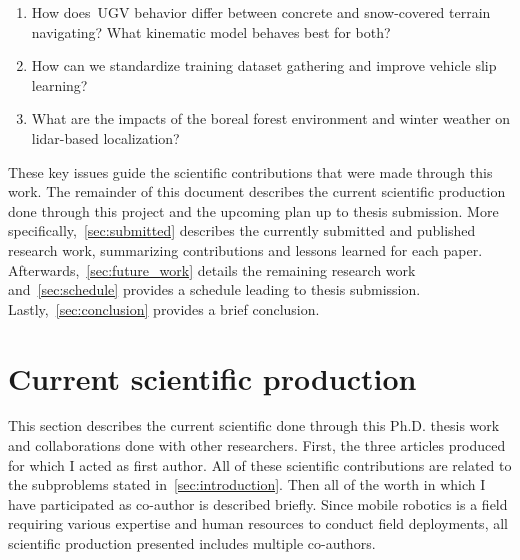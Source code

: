 \documentclass[12pt,letterpaper,oneside]{article}
\begin{document}
\begin{enumerate}\bfseries
	\item How does~\ac{UGV} behavior differ between concrete and snow-covered terrain navigating? What kinematic model behaves best for both?
	\item How can we standardize training dataset gathering and improve vehicle slip learning?
	\item What are the impacts of the boreal forest environment and winter weather on lidar-based localization?
\end{enumerate}

These key issues guide the scientific contributions that were made through this work.
The remainder of this document describes the current scientific production done through this project and the upcoming plan up to thesis submission.
More specifically,~\autoref{sec:submitted} describes the currently submitted and published research work, summarizing contributions and lessons learned for each paper. 
Afterwards,~\autoref{sec:future_work} details the remaining research work and~\autoref{sec:schedule} provides a schedule leading to thesis submission.
Lastly,~\autoref{sec:conclusion} provides a brief conclusion.


\section{Current scientific production}
\label{sec:submitted}

This section describes the current scientific done through this Ph.D. thesis work and collaborations done with other researchers. 
First, the three articles produced for which I acted as first author.
All of these scientific contributions are related to the subproblems stated in~\autoref{sec:introduction}.
Then all of the worth in which I have participated as co-author is described briefly.
Since mobile robotics is a field requiring various expertise and human resources to conduct field deployments, all scientific production presented includes multiple co-authors.

\end{document}
